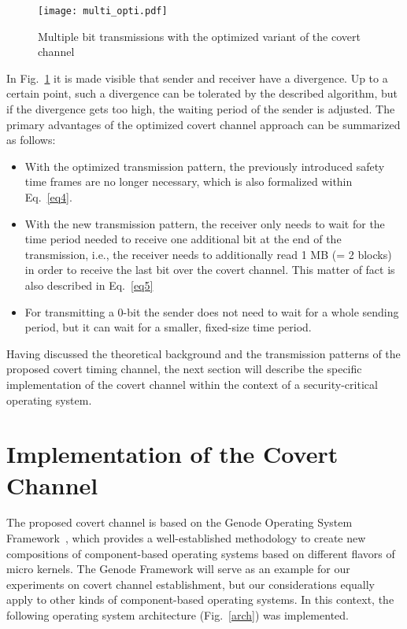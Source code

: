 \documentclass[runningheads,a4paper]{llncs}
\begin{document}
\begin{figure}[!ht]
\texttt{[image: multi\_opti.pdf]}
\caption{Multiple bit transmissions with the optimized variant of the covert channel}
\label{multi_opti}
\end{figure}

In Fig.~\ref{multi_opti} it is made visible that sender and receiver have a divergence.
Up to a certain point, such a divergence can be tolerated by the described algorithm, but if the divergence gets too high, the waiting period of the sender is adjusted.
The primary advantages of the optimized covert channel approach can be summarized as follows:

\begin{itemize}
\item With the optimized transmission pattern, the previously introduced safety time frames are no longer necessary, which is also formalized within Eq.~\ref{eq4}.



\item With the new transmission pattern, the receiver only needs to wait for the time period needed to receive one additional bit at the end of the transmission, i.e., the receiver needs to additionally read 1 MB (= 2 blocks) in order to receive the last bit over the covert channel.
This matter of fact is also described in Eq.~\ref{eq5}



\item For transmitting a 0-bit the sender does not need to wait for a whole sending period, but it can wait for a smaller, fixed-size time period.
\end{itemize}

Having discussed the theoretical background and the transmission patterns of the proposed covert timing channel, the next section will describe the specific implementation of the covert channel within the context of a security-critical operating system.

\section{Implementation of the Covert Channel}\label{sec4}

The proposed covert channel is based on the Genode Operating System Framework~\cite{genode}, which provides a well-established methodology to create new compositions of component-based operating systems based on different flavors of micro kernels. 
The Genode Framework will serve as an example for our experiments on covert channel establishment, but our considerations equally apply to other kinds of component-based operating systems.
In this context, the following operating system architecture (Fig.~\ref{arch}) was implemented.
\end{document}
